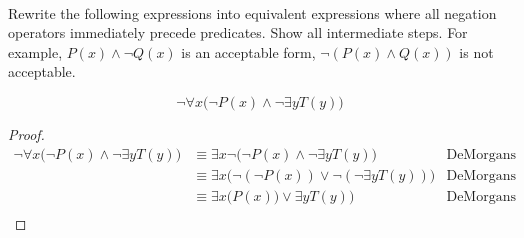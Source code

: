 \begin{exmp}[]\ \\
Rewrite the following expressions into equivalent expressions where all negation operators immediately precede predicates. Show all intermediate steps. For example, $P(x) \land \lnot Q(x)$ is an acceptable form, $\lnot(P(x) \land Q(x))$ is not acceptable.

    \[\lnot \forall x \bigl( \lnot P(x) \land \lnot \exists y T(y) \bigr)\]
    \vspace{3cm}
\begin{proof}
 \begin{align}
\lnot \forall x \bigl( \lnot P(x) \land \lnot \exists y T(y) \bigr)&\equiv  \exists x \lnot \bigl( \lnot P(x) \land \lnot \exists y T(y) \bigr)&\text{DeMorgans negation of universal quantifier}\\
&\equiv  \exists x  \bigl( \lnot(\lnot P(x)) \lor \lnot(\lnot \exists y T(y) )\bigr)&\text{DeMorgans}\\
&\equiv  \exists x  \bigl( P(x)) \lor \exists y T(y) \bigr)&\text{DeMorgans}\\
 \end{align}
\end{proof}
\end{exmp}
